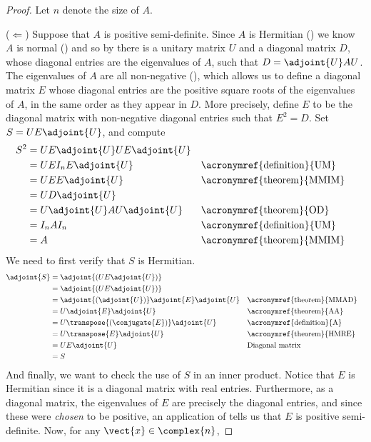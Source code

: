 \begin{proof}
Let $n$ denote the size of $A$.\par
%
($\Leftarrow$)
Suppose that $A$ is positive semi-definite.  Since $A$ is Hermitian () we know $A$ is normal () and so by  there is a unitary matrix $U$ and a diagonal matrix $D$, whose diagonal entries are the eigenvalues of $A$, such that $D=\adjoint{U}AU$.  The eigenvalues of $A$ are all non-negative (), which allows us to define a diagonal matrix $E$ whose diagonal entries are the positive square roots of the eigenvalues of $A$, in the same order as they appear in $D$.  More precisely, define $E$ to be the diagonal matrix with non-negative diagonal entries such that $E^2=D$.  Set $S=UE\adjoint{U}$, and compute
%
\begin{align*}
S^2
&=UE\adjoint{U}UE\adjoint{U}\\
&=UEI_nE\adjoint{U}&&\text{\acronymref{definition}{UM}}\\
&=UEE\adjoint{U}&&\text{\acronymref{theorem}{MMIM}}\\
&=UD\adjoint{U}\\
&=U\adjoint{U}AU\adjoint{U}&&\text{\acronymref{theorem}{OD}}\\
&=I_nAI_n&&\text{\acronymref{definition}{UM}}\\
&=A&&\text{\acronymref{theorem}{MMIM}}
\end{align*}
%
We need to first verify that $S$ is Hermitian.
%
\begin{align*}
\adjoint{S}
&=\adjoint{\left(UE\adjoint{U}\right)}\\
&=\adjoint{\left(UE\adjoint{U}\right)}\\
&=\adjoint{\left(\adjoint{U}\right)}\adjoint{E}\adjoint{U}&&\text{\acronymref{theorem}{MMAD}}\\
&=U\adjoint{E}\adjoint{U}&&\text{\acronymref{theorem}{AA}}\\
&=U\transpose{\left(\conjugate{E}\right)}\adjoint{U}&&\text{\acronymref{definition}{A}}\\
&=U\transpose{E}\adjoint{U}&&\text{\acronymref{theorem}{HMRE}}\\
&=UE\adjoint{U}&&\text{Diagonal matrix}\\
&=S
\end{align*}
%
And finally, we want to check the use of $S$ in an inner product.    Notice that $E$ is Hermitian since it is a diagonal matrix with real entries.  Furthermore, as a diagonal matrix, the eigenvalues of $E$ are precisely the diagonal entries, and since these were {\em chosen} to be positive, an application of  tells us that $E$ is positive semi-definite.  Now, for any $\vect{x}\in\complex{n}$,

\end{proof}
